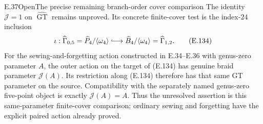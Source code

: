 \begin{result}{E.37}{Open}{The precise remaining branch-order cover comparison}
The identity $\mathcal J=1$ on
$\widehat{\operatorname{GT}}$ remains unproved.
Its concrete finite-cover test is the index-$24$
inclusion
\[
 \iota:\widehat\Gamma_{0,5}
       =\widehat P_4/\langle\omega_4\rangle
       \lhook\joinrel\longrightarrow
       \widehat B_4/\langle\omega_4\rangle
       =\widehat\Gamma_{1,2}.                          \tag{E.134}
\]
For the sewing-and-forgetting action constructed
in E.34--E.36 with genus-zero parameter $A$,
the outer action on the target of (E.134)
has genuine braid parameter $\mathcal J(A)$.
Its restriction along (E.134) therefore has
that same GT parameter on the source.
Compatibility with the separately named
genus-zero five-point object is exactly
$\mathcal J(A)=A$.
Thus the unresolved assertion is this
same-parameter finite-cover comparison;
ordinary sewing and forgetting have the
explicit paired action already proved.
\end{result}
